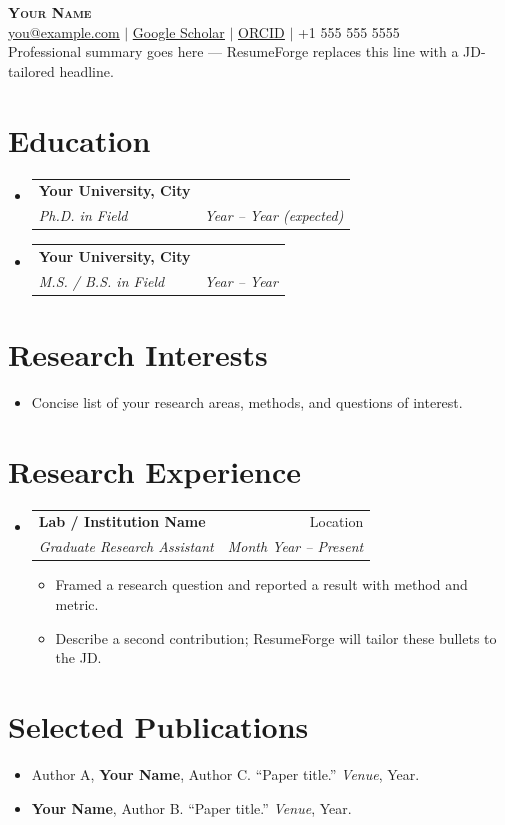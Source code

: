 \documentclass[letterpaper,10pt]{article}
\makeatletter
\newcommand{\resumeItem}[1]{
  \item{\small\setlength{\baselineskip}{11pt} #1 \vspace{-2pt}}
}
\newcommand{\resumeSubheading}[4]{
  \vspace{-2pt}\item
    \begin{tabular*}{\textwidth}[t]{@{}p{0.75\textwidth}@{\extracolsep{\fill}}r@{}}
      \textbf{#1} & \small #2 \\
      \textit{\small#3} & \textit{\small #4} \\
    \end{tabular*}\vspace{-4pt}
}
\newcommand{\resumeSubHeadingListStart}{\begin{itemize}[leftmargin=0in, label={}, topsep=0pt, partopsep=0pt]}
\newcommand{\resumeSubHeadingListEnd}{\end{itemize}}
\newcommand{\resumeItemListStart}{\begin{itemize}[leftmargin=0.15in, label={$\bullet$}, topsep=0pt, partopsep=0pt, itemsep=3pt, parsep=0pt]}
\newcommand{\resumeItemListEnd}{\end{itemize}}
\makeatother
\begin{document}
\fontsize{10.5}{12}\selectfont
\begin{center}
    {\Huge \scshape \textbf{Your Name}} \\ \vspace{4pt}
    \href{mailto:you@example.com}{\ul{you@example.com}} $|$
    \href{https://scholar.google.com/citations?user=XXXX}{\ul{Google Scholar}} $|$
    \href{https://orcid.org/0000-0000-0000-0000}{\ul{ORCID}} $|$
    +1 555 555 5555 \\ \vspace{6pt}
    {Professional summary goes here — ResumeForge replaces this line with a JD-tailored headline.}
\end{center}
\section{Education}
\resumeSubHeadingListStart
  \resumeSubheading
    {Your University, City}{}
    {Ph.D. in Field}{\textit{Year -- Year (expected)}}  \vspace{-5pt}
  \resumeSubheading
    {Your University, City}{}
    {M.S. / B.S. in Field}{\textit{Year -- Year}}
\resumeSubHeadingListEnd
\section{Research Interests}
\resumeSubHeadingListStart
  \resumeItem{Concise list of your research areas, methods, and questions of interest.}
\resumeSubHeadingListEnd
\section{Research Experience}
\resumeSubHeadingListStart
  \resumeSubheading
    {Lab / Institution Name}{Location}
    {Graduate Research Assistant}{Month Year -- Present}
    \resumeItemListStart
      \resumeItem{Framed a research question and reported a result with method and metric.}
      \resumeItem{Describe a second contribution; ResumeForge will tailor these bullets to the JD.}
    \resumeItemListEnd
\resumeSubHeadingListEnd
\section{Selected Publications}
\resumeSubHeadingListStart
  \resumeItem{Author A, \textbf{Your Name}, Author C. ``Paper title.'' \textit{Venue}, Year.}
  \resumeItem{\textbf{Your Name}, Author B. ``Paper title.'' \textit{Venue}, Year.}
\resumeSubHeadingListEnd
\end{document}

